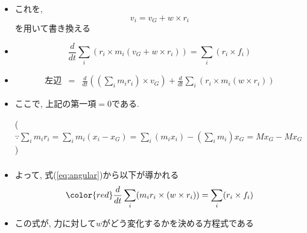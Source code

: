 \documentclass[10pt,dvipdfmx]{beamer}
\newcommand{\aka}[1]{{\color{red}#1}}
\begin{document}
\begin{frame}
\frametitle{}
\begin{itemize}
\item [] これを,
\[ v_i = v_G + w \times r_i \]
を用いて書き換える
\item []
\begin{equation}
\frac{d}{dt} \sum_i (r_i \times m_i (v_G + w \times r_i)) = \sum_i (r_i \times f_i )
\label{eq:angular}
\end{equation}
\item []
\begin{eqnarray*}
\mbox{左辺} & = & 
\frac{d}{dt} \left(\left(\sum_i m_i r_i\right) \times v_G \right)
+ \frac{d}{dt} \sum_i (r_i \times m_i (w \times r_i))
\end{eqnarray*}
\item [] ここで, 上記の第一項$=0$である.

($\because
\sum_i m_i r_i
= \sum_i m_i (x_i - x_G)
= \sum_i (m_i x_i) - \left(\sum_i m_i\right) x_G
= M x_G - M x_G 
$)

\end{itemize}
\end{frame}


\begin{frame}
\frametitle{}
\begin{itemize}
\item []
よって, 式(\ref{eq:angular})から以下が導かれる
\begin{equation}
\aka{\frac{d}{dt} \sum_i (m_i r_i \times (w \times r_i)) = \sum_i (r_i \times f_i)}
\label{eq:angular2}
\end{equation}
\item [] この式が, \aka{力に対して$w$がどう変化するかを決める方程式}である
\end{itemize}
\end{frame}
\end{document}
